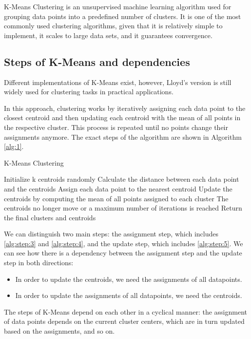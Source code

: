 K-Means Clustering is an unsupervised machine learning algorithm used for grouping data points into a predefined number of clusters. It is one of the most commonly used clustering algorithms, given that it is relatively simple to implement, it scales to large data sets, and it guarantees convergence.

\subsection{Steps of K-Means and dependencies}

Different implementations of K-Means exist, however, Lloyd's version is still widely used for clustering tasks in practical applications.

In this approach, clustering works by iteratively assigning each data point to the closest centroid and then updating each centroid with the mean of all points in the respective cluster. This process is repeated until no points change their assignments anymore. The exact steps of the algorithm are shown in Algorithm \ref{alg:1}.

\begin{algorithm}
\caption{K-Means Clustering}
\begin{algorithmic}[1]
    \State Initialize k centroids randomly
    \Repeat
    \State Calculate the distance between each data point and the centroids
    \label{alg:step:3}
    \State Assign each data point to the nearest centroid
    \label{alg:step:4}
    \State Update the centroids by computing the mean of all points assigned to each cluster
    \label{alg:step:5}
    \Until The centroids no longer move or a maximum number of iterations is reached
    \State Return the final clusters and centroids
\end{algorithmic}
\label{alg:1}
\end{algorithm}

We can distinguish two main steps: the assignment step, which includes \ref{alg:step:3} and \ref{alg:step:4}, and the update step, which includes \ref{alg:step:5}.
We can see how there is a dependency between the assignment step and the update step in both directions:
\begin{itemize}
    \item In order to update the centroids, we need the assignments of all datapoints.
    \item In order to update the assignments of all datapoints, we need the centroids.
\end{itemize}
The steps of K-Means depend on each other in a cyclical manner: the assignment of data points depends on the current cluster centers, which are in turn updated based on the assignments, and so on.


